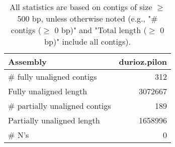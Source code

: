 \documentclass[12pt,a4paper]{article}
\begin{document}
\begin{table}[ht]
\begin{center}
\caption{All statistics are based on contigs of size $\geq$ 500 bp, unless otherwise noted (e.g., "\# contigs ($\geq$ 0 bp)" and "Total length ($\geq$ 0 bp)" include all contigs).}
\begin{tabular}{|l*{1}{|r}|}
\hline
Assembly & durioz.pilon \\ \hline
\# fully unaligned contigs & 312 \\ \hline
Fully unaligned length & 3072667 \\ \hline
\# partially unaligned contigs & 189 \\ \hline
Partially unaligned length & 1658996 \\ \hline
\# N's & 0 \\ \hline
\end{tabular}
\end{center}
\end{table}
\end{document}
